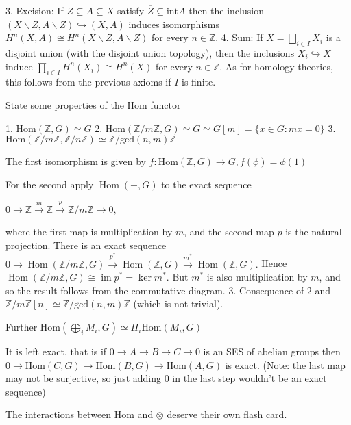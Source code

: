 3.  Excision: If \(Z \subseteq A \subseteq X\) satisfy \(\overline{Z} \subseteq \text{int} A\) then the inclusion \((X \backslash Z, A \backslash Z) \hookrightarrow (X, A)\) 
    induces isomorphisms \(H^n(X, A) \cong H^n(X \backslash Z, A \backslash Z)\) for every \(n \in \mathbb{Z}\).
4.  Sum: If \(X = \bigsqcup_{i \in I} X_i\) is a disjoint union (with the disjoint union topology), then the 
    inclusions \(X_i \hookrightarrow X\) induce \(\prod_{i \in I} H^n(X_i) \cong H^n(X)\) for every \(n \in \mathbb{Z}\). 
    As for homology theories, this follows from the previous axioms if \(I\) is finite.



State some properties of the \( \text{Hom} \) functor

1. \( \text{Hom}(\mathbb{Z}, G) \simeq G\)
2. \( \text{Hom}(\mathbb{Z}/m\mathbb{Z}, G) \simeq G \simeq G[m] = \{x \in G: mx = 0\} \)
3. \( \text{Hom}(\mathbb{Z}/m\mathbb{Z}, \mathbb{Z}/n\mathbb{Z}) \simeq \mathbb{Z}/\text{gcd}(n,m)\mathbb{Z} \)

The first isomorphism is given by \( f : \text{Hom}(\mathbb{Z}, G) \to G, f(\phi) = \phi(1) \)

For the second apply \(\operatorname{Hom}(-, G)\) to the exact sequence 

\(
0 \longrightarrow \mathbb{Z} \xrightarrow{m} \mathbb{Z} \xrightarrow{p} \mathbb{Z}/m\mathbb{Z} \longrightarrow 0,
\)

where the first map is multiplication by \( m \), and the second map \( p \) is the natural projection. There is an exact sequence
\(
0 \longrightarrow \operatorname{Hom}(\mathbb{Z}/m\mathbb{Z}, G) \xrightarrow{p^*} \operatorname{Hom}(\mathbb{Z}, G) \xrightarrow{m^*} \operatorname{Hom}(\mathbb{Z}, G).
\)
Hence \(\operatorname{Hom}(\mathbb{Z}/m\mathbb{Z}, G) \cong \operatorname{im} p^* = \ker m^*\). But \(m^\ast\) is also multiplication by 
\( m \), and so the result follows from the commutative diagram.
3. Consequence of \( 2 \) and \( \mathbb{Z}/m\mathbb{Z}[n] \simeq \mathbb{Z}/\text{gcd}(n,m)\mathbb{Z} \) (which is not trivial).

Further
\( \text{Hom}(\bigoplus_i M_i, G) \simeq \Pi_i \text{Hom}(M_i, G) \)

It is left exact, that is if 
\( 0 \to A \to B \to C \to 0 \) is an SES of abelian groups then 
\( 0 → \text{Hom}(C, G) → \text{Hom}(B, G) → \text{Hom}(A, G) \)
is exact.  (Note: the last map may not be surjective, so just adding \( 0 \) in the last step
wouldn't be an exact sequence)

The interactions between \( \text{Hom} \) and \( \otimes \) deserve their own flash card.

